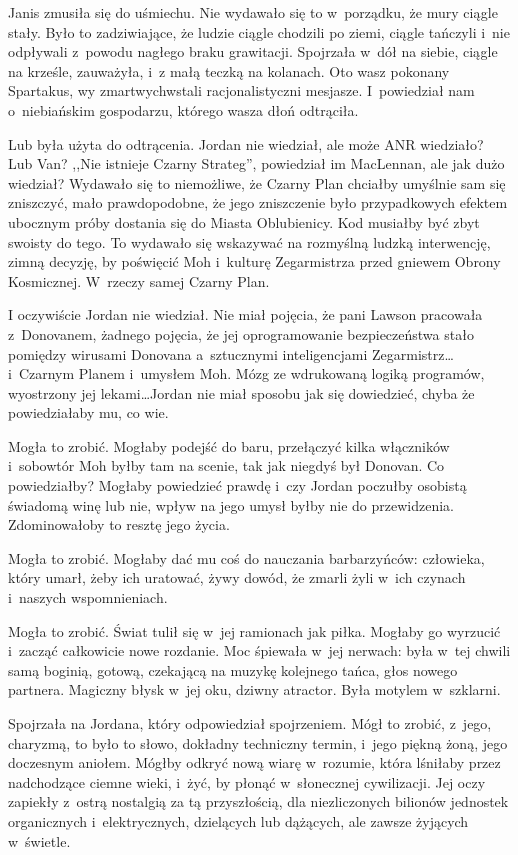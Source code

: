 \documentclass[oneside,polish,11pt,sfheadings]{mwbk}
\begin{document}
Janis zmusiła się do uśmiechu. Nie wydawało się to w~porządku, że mury
ciągle stały. Było to zadziwiające, że ludzie ciągle chodzili po ziemi,
ciągle tańczyli i~nie odpływali z~powodu nagłego braku grawitacji.
Spojrzała w~dół na siebie, ciągle na krześle, zauważyła, i~z małą teczką
na kolanach. Oto wasz pokonany Spartakus, wy zmartwychwstali
racjonalistyczni mesjasze. I~powiedział nam o~niebiańskim gospodarzu,
którego wasza dłoń odtrąciła.

Lub była użyta do odtrącenia. Jordan nie wiedział, ale może ANR
wiedziało? Lub Van? ,,Nie istnieje Czarny Strateg'', powiedział im
MacLennan, ale jak dużo wiedział? Wydawało się to niemożliwe, że Czarny
Plan chciałby umyślnie sam się zniszczyć, mało prawdopodobne, że jego
zniszczenie było przypadkowych efektem ubocznym próby dostania się do
Miasta Oblubienicy. Kod musiałby być zbyt swoisty do tego. To wydawało
się wskazywać na rozmyślną ludzką interwencję, zimną decyzję, by
poświęcić Moh i~kulturę Zegarmistrza przed gniewem Obrony Kosmicznej. W~rzeczy samej Czarny Plan.

I oczywiście Jordan nie wiedział. Nie miał pojęcia, że pani Lawson
pracowała z~Donovanem, żadnego pojęcia, że jej oprogramowanie
bezpieczeństwa stało pomiędzy wirusami Donovana a~sztucznymi
inteligencjami Zegarmistrz\ldots i~Czarnym Planem i~umysłem Moh. Mózg ze
wdrukowaną logiką programów, wyostrzony jej lekami\ldots Jordan nie miał
sposobu jak się dowiedzieć, chyba że powiedziałaby mu, co wie.

Mogła to zrobić. Mogłaby podejść do baru, przełączyć kilka włączników i~sobowtór Moh byłby tam na scenie, tak jak niegdyś był Donovan. Co
powiedziałby? Mogłaby powiedzieć prawdę i~czy Jordan poczułby osobistą
świadomą winę lub nie, wpływ na jego umysł byłby nie do przewidzenia.
Zdominowałoby to resztę jego życia.

Mogła to zrobić. Mogłaby dać mu coś do nauczania barbarzyńców:
człowieka, który umarł, żeby ich uratować, żywy dowód, że zmarli żyli w~ich czynach i~naszych wspomnieniach.

Mogła to zrobić. Świat tulił się w~jej ramionach jak piłka. Mogłaby go
wyrzucić i~zacząć całkowicie nowe rozdanie. Moc śpiewała w~jej nerwach:
była w~tej chwili samą boginią, gotową, czekającą na muzykę kolejnego
tańca, głos nowego partnera. Magiczny błysk w~jej oku, dziwny atractor.
Była motylem w~szklarni.

Spojrzała na Jordana, który odpowiedział spojrzeniem. Mógł to zrobić, z~jego, charyzmą, to było to słowo, dokładny techniczny termin, i~jego
piękną żoną, jego doczesnym aniołem. Mógłby odkryć nową wiarę w~rozumie,
która lśniłaby przez nadchodzące ciemne wieki, i~żyć, by płonąć w~słonecznej cywilizacji. Jej oczy zapiekły z~ostrą nostalgią za tą
przyszłością, dla niezliczonych bilionów jednostek organicznych i~elektrycznych, dzielących lub dążących, ale zawsze żyjących w~świetle.
\end{document}
